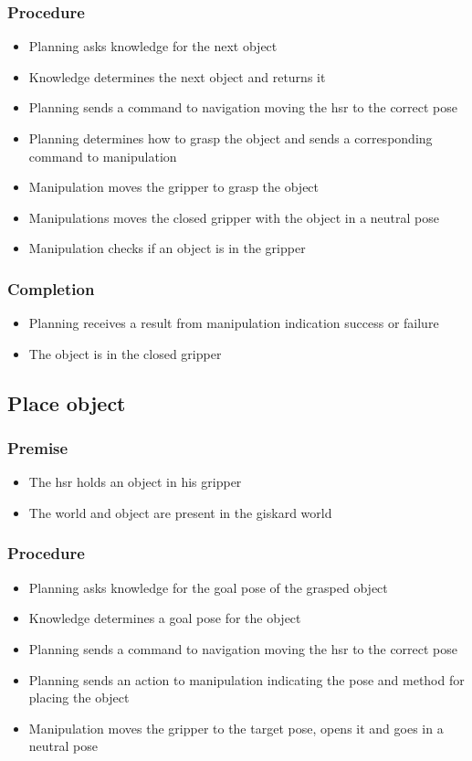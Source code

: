 \documentclass[main.tex]{subfiles}
\begin{document}
	\subsubsection{Procedure}
	\begin{itemize}			
		\item Planning asks knowledge for the next object
		\item Knowledge determines the next object and returns it
		\item Planning sends a command to navigation moving the hsr to the correct pose
		\item Planning determines how to grasp the object and sends a corresponding command to manipulation
		\item Manipulation moves the gripper to grasp the object
		\item Manipulations moves the closed gripper with the object in a neutral pose
		\item Manipulation checks if an object is in the gripper 				
	\end{itemize}
	
	\subsubsection{Completion}
	\begin{itemize}
		\item Planning receives a result from manipulation indication success or failure
		\item The object is in the closed gripper	
	\end{itemize}
	
	\subsection{Place object}
	
	\subsubsection{Premise}
	\begin{itemize}
		\item The hsr holds an object in his gripper
		\item The world and object are present in the giskard world
	\end{itemize} 
	
	\subsubsection{Procedure}
	\begin{itemize}			
		\item Planning asks knowledge for the goal pose of the grasped object
		\item Knowledge determines a goal pose for the object
		\item Planning sends a command to navigation moving the hsr to the correct pose
		\item Planning sends an action to manipulation indicating the pose and method for placing the object
		\item Manipulation moves the gripper to the target pose, opens it and goes in a neutral pose 				
	\end{itemize}
	
\end{document}
